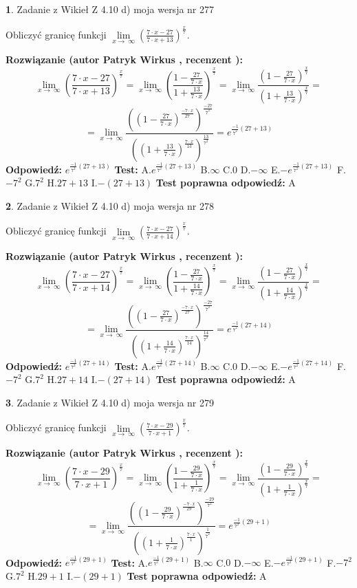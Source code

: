 \documentclass[12pt, a4paper]{article}
\theoremstyle{definition} %
\newtheorem{zad}{}
\newcommand{\zadStart}[1]{\begin{zad}#1\newline}
\newcommand{\zadStop}{\end{zad}}
\newcommand{\rozwStart}[2]{\noindent \textbf{Rozwiązanie (autor #1 , recenzent #2): }\newline}
\newcommand{\rozwStop}{\newline}
\newcommand{\odpStart}{\noindent \textbf{Odpowiedź:}\newline}
\newcommand{\odpStop}{\newline}
\newcommand{\testStart}{\noindent \textbf{Test:}\newline}
\newcommand{\testStop}{\newline}
\newcommand{\kluczStart}{\noindent \textbf{Test poprawna odpowiedź:}\newline}
\newcommand{\kluczStop}{\newline}
\begin{document}
\zadStart{Zadanie z Wikieł Z 4.10 d) moja wersja nr 277}


Obliczyć granicę funkcji  $\lim\limits_{x\to\ \infty}(\frac{7\cdot x-27}{7\cdot x+13})^{\frac{x}{7}}$.
\zadStop
\rozwStart{Patryk Wirkus}{}
$$\lim\limits_{x\to\ \infty}(\frac{7\cdot x-27}{7\cdot x+13})^{\frac{x}{7}} = \lim\limits_{x\to\ \infty}(\frac{1-\frac{27}{7\cdot x}}{1+\frac{13}{7\cdot x}})^{\frac{x}{7}}=\lim\limits_{x\to\ \infty}\frac{(1-\frac{27}{7\cdot x})^{\frac{x}{7}}}{(1+\frac{13}{7\cdot x})^{\frac{x}{7}}}=$$
$$=\lim\limits_{x\to\ \infty}\frac{((1-\frac{27}{7\cdot x})^{\frac{-7\cdot x}{27}})^{\frac{-27}{7^{2}}}}{((1+\frac{13}{7\cdot x})^{\frac{7\cdot x}{13}})^{\frac{13}{7^{2}}}}=e^{\frac{-1}{7^{2}}(27+13)}$$
\rozwStop
\odpStart
$e^{\frac{-1}{7^{2}}(27+13)}$
\odpStop
\testStart
A.$e^{\frac{-1}{7^{2}}(27+13)}$ B.$\infty$ C.$0$ D.$-\infty$ E.$-e^{\frac{-1}{7^{2}}(27+13)}$
F.$-7^{2}$ G.$7^{2}$
H.$27+13$
I.$-(27+13)$
\testStop
\kluczStart
A
\kluczStop



\zadStart{Zadanie z Wikieł Z 4.10 d) moja wersja nr 278}


Obliczyć granicę funkcji  $\lim\limits_{x\to\ \infty}(\frac{7\cdot x-27}{7\cdot x+14})^{\frac{x}{7}}$.
\zadStop
\rozwStart{Patryk Wirkus}{}
$$\lim\limits_{x\to\ \infty}(\frac{7\cdot x-27}{7\cdot x+14})^{\frac{x}{7}} = \lim\limits_{x\to\ \infty}(\frac{1-\frac{27}{7\cdot x}}{1+\frac{14}{7\cdot x}})^{\frac{x}{7}}=\lim\limits_{x\to\ \infty}\frac{(1-\frac{27}{7\cdot x})^{\frac{x}{7}}}{(1+\frac{14}{7\cdot x})^{\frac{x}{7}}}=$$
$$=\lim\limits_{x\to\ \infty}\frac{((1-\frac{27}{7\cdot x})^{\frac{-7\cdot x}{27}})^{\frac{-27}{7^{2}}}}{((1+\frac{14}{7\cdot x})^{\frac{7\cdot x}{14}})^{\frac{14}{7^{2}}}}=e^{\frac{-1}{7^{2}}(27+14)}$$
\rozwStop
\odpStart
$e^{\frac{-1}{7^{2}}(27+14)}$
\odpStop
\testStart
A.$e^{\frac{-1}{7^{2}}(27+14)}$ B.$\infty$ C.$0$ D.$-\infty$ E.$-e^{\frac{-1}{7^{2}}(27+14)}$
F.$-7^{2}$ G.$7^{2}$
H.$27+14$
I.$-(27+14)$
\testStop
\kluczStart
A
\kluczStop



\zadStart{Zadanie z Wikieł Z 4.10 d) moja wersja nr 279}


Obliczyć granicę funkcji  $\lim\limits_{x\to\ \infty}(\frac{7\cdot x-29}{7\cdot x+1})^{\frac{x}{7}}$.
\zadStop
\rozwStart{Patryk Wirkus}{}
$$\lim\limits_{x\to\ \infty}(\frac{7\cdot x-29}{7\cdot x+1})^{\frac{x}{7}} = \lim\limits_{x\to\ \infty}(\frac{1-\frac{29}{7\cdot x}}{1+\frac{1}{7\cdot x}})^{\frac{x}{7}}=\lim\limits_{x\to\ \infty}\frac{(1-\frac{29}{7\cdot x})^{\frac{x}{7}}}{(1+\frac{1}{7\cdot x})^{\frac{x}{7}}}=$$
$$=\lim\limits_{x\to\ \infty}\frac{((1-\frac{29}{7\cdot x})^{\frac{-7\cdot x}{29}})^{\frac{-29}{7^{2}}}}{((1+\frac{1}{7\cdot x})^{\frac{7\cdot x}{1}})^{\frac{1}{7^{2}}}}=e^{\frac{-1}{7^{2}}(29+1)}$$
\rozwStop
\odpStart
$e^{\frac{-1}{7^{2}}(29+1)}$
\odpStop
\testStart
A.$e^{\frac{-1}{7^{2}}(29+1)}$ B.$\infty$ C.$0$ D.$-\infty$ E.$-e^{\frac{-1}{7^{2}}(29+1)}$
F.$-7^{2}$ G.$7^{2}$
H.$29+1$
I.$-(29+1)$
\testStop
\kluczStart
A
\kluczStop
\end{document}
